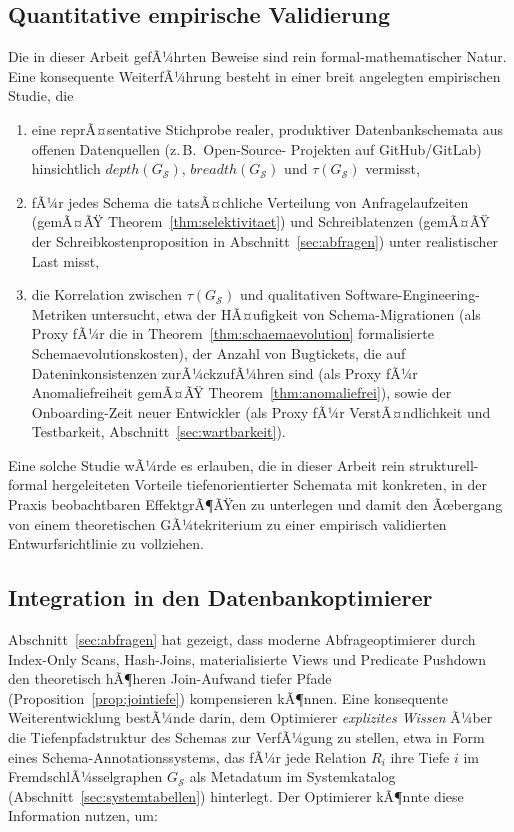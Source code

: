 ﻿\documentclass[a4paper,12pt]{report}
\theoremstyle{definition}
\theoremstyle{remark}
\newcommand{\depth}{\mathit{depth}}
\newcommand{\breadth}{\mathit{breadth}}
\begin{document}
\subsection{Quantitative empirische Validierung}
\label{sec:ausblick-empirie}

Die in dieser Arbeit gefÃ¼hrten Beweise sind rein formal-mathematischer
Natur. Eine konsequente WeiterfÃ¼hrung besteht in einer breit angelegten
empirischen Studie, die

\begin{enumerate}
  \item eine reprÃ¤sentative Stichprobe realer, produktiver
    Datenbankschemata aus offenen Datenquellen (z.\,B.\ Open-Source-
    Projekten auf GitHub/GitLab) hinsichtlich $\depth(G_{\mathcal{S}})$,
    $\breadth(G_{\mathcal{S}})$ und $\tau(G_{\mathcal{S}})$ vermisst,
  \item fÃ¼r jedes Schema die tatsÃ¤chliche Verteilung von
    Anfragelaufzeiten (gemÃ¤ÃŸ Theorem~\ref{thm:selektivitaet}) und
    Schreiblatenzen (gemÃ¤ÃŸ der Schreibkostenproposition in
    Abschnitt~\ref{sec:abfragen}) unter realistischer Last misst,
  \item die Korrelation zwischen $\tau(G_{\mathcal{S}})$ und
    qualitativen Software-Engineering-Metriken untersucht, etwa der
    HÃ¤ufigkeit von Schema-Migrationen (als Proxy fÃ¼r die in
    Theorem~\ref{thm:schaemaevolution} formalisierte
    Schemaevolutionskosten), der Anzahl von Bugtickets, die auf
    Dateninkonsistenzen zurÃ¼ckzufÃ¼hren sind (als Proxy fÃ¼r
    Anomaliefreiheit gemÃ¤ÃŸ Theorem~\ref{thm:anomaliefrei}), sowie der
    Onboarding-Zeit neuer Entwickler (als Proxy fÃ¼r
    VerstÃ¤ndlichkeit und Testbarkeit, Abschnitt~\ref{sec:wartbarkeit}).
\end{enumerate}

Eine solche Studie wÃ¼rde es erlauben, die in dieser Arbeit rein
strukturell-formal hergeleiteten Vorteile tiefenorientierter Schemata
mit konkreten, in der Praxis beobachtbaren EffektgrÃ¶ÃŸen zu
unterlegen und damit den Ãœbergang von einem theoretischen
GÃ¼tekriterium zu einer empirisch validierten Entwurfsrichtlinie zu
vollziehen.

\subsection{Integration in den Datenbankoptimierer}
\label{sec:ausblick-optimizer}

Abschnitt~\ref{sec:abfragen} hat gezeigt, dass moderne
Abfrageoptimierer durch Index-Only Scans, Hash-Joins, materialisierte
Views und Predicate Pushdown den theoretisch hÃ¶heren Join-Aufwand
tiefer Pfade (Proposition~\ref{prop:jointiefe}) kompensieren kÃ¶nnen.
Eine konsequente Weiterentwicklung bestÃ¼nde darin, dem Optimierer
\emph{explizites Wissen} Ã¼ber die Tiefenpfadstruktur des Schemas zur
VerfÃ¼gung zu stellen, etwa in Form eines Schema-Annotationssystems, das
fÃ¼r jede Relation $R_i$ ihre Tiefe $i$ im FremdschlÃ¼sselgraphen
$G_{\mathcal{S}}$ als Metadatum im Systemkatalog
(Abschnitt~\ref{sec:systemtabellen}) hinterlegt. Der Optimierer kÃ¶nnte
diese Information nutzen, um:
\end{document}
